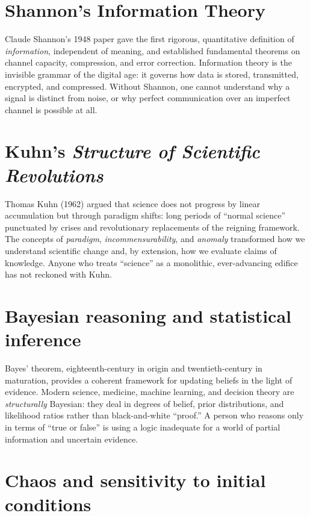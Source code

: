 \section{Shannon's Information Theory}

Claude Shannon's 1948 paper gave the first rigorous, quantitative definition of \emph{information}, independent of meaning, and established fundamental theorems on channel capacity, compression, and error correction. Information theory is the invisible grammar of the digital age: it governs how data is stored, transmitted, encrypted, and compressed. Without Shannon, one cannot understand why a signal is distinct from noise, or why perfect communication over an imperfect channel is possible at all.

\section{Kuhn's \emph{Structure of Scientific Revolutions}}

Thomas Kuhn (1962) argued that science does not progress by linear accumulation but through paradigm shifts: long periods of ``normal science'' punctuated by crises and revolutionary replacements of the reigning framework. The concepts of \emph{paradigm}, \emph{incommensurability}, and \emph{anomaly} transformed how we understand scientific change and, by extension, how we evaluate claims of knowledge. Anyone who treats ``science'' as a monolithic, ever-advancing edifice has not reckoned with Kuhn.

\section{Bayesian reasoning and statistical inference}

Bayes' theorem, eighteenth-century in origin and twentieth-century in maturation, provides a coherent framework for updating beliefs in the light of evidence. Modern science, medicine, machine learning, and decision theory are \emph{structurally} Bayesian: they deal in degrees of belief, prior distributions, and likelihood ratios rather than black-and-white ``proof.'' A person who reasons only in terms of ``true or false'' is using a logic inadequate for a world of partial information and uncertain evidence.

\section{Chaos and sensitivity to initial conditions}

